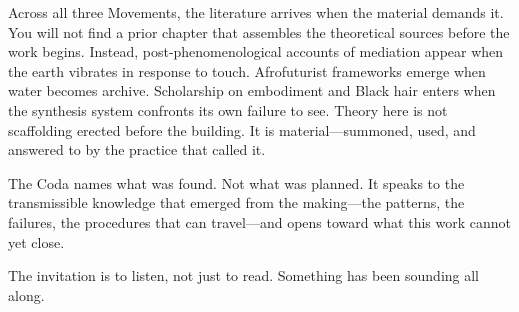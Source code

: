Across all three Movements, the literature arrives when the material demands it. You will not find a prior chapter that assembles the theoretical sources before the work begins. Instead, post-phenomenological accounts of mediation appear when the earth vibrates in response to touch. Afrofuturist frameworks emerge when water becomes archive. Scholarship on embodiment and Black hair enters when the synthesis system confronts its own failure to see. Theory here is not scaffolding erected before the building. It is material---summoned, used, and answered to by the practice that called it.

The Coda names what was found. Not what was planned. It speaks to the transmissible knowledge that emerged from the making---the patterns, the failures, the procedures that can travel---and opens toward what this work cannot yet close.

The invitation is to listen, not just to read. Something has been sounding all along.

